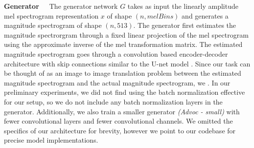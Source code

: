 \documentclass[a4paper]{article}
\begin{document}
\textbf{Generator}~~~The generator network $G$ takes as input the linearly amplitude mel spectrogram representation $x$ of shape $(n, \mathit{melBins})$ and generates a magnitude spectrogram of shape $(n, 513)$. The generator first estimates the magnitude spectrorgram through a fixed linear projection of the mel spectrogram using the approximate inverse of the mel transformation matrix. The estimated magnitude spectrogram goes through a convolution based encoder-decoder architecture with skip connections similar to the U-net model \cite{unet}. Since our task can be thought of as an image to image translation problem between the estimated magnitude spectrogram and the actual magnitude spectrogram, we \cite{pix2pix}.
In our preliminary experiments, we did not find using the batch normalization effective for our setup, so we do not include any batch normalization layers in the generator.
Additionally, we also train a smaller generator \textit{(Advoc - small)} with fewer convolutional layers and fewer convolutional channels. We omitted the specifics of our architecture for brevity, however we point to our codebase for precise model implementations.
\end{document}
